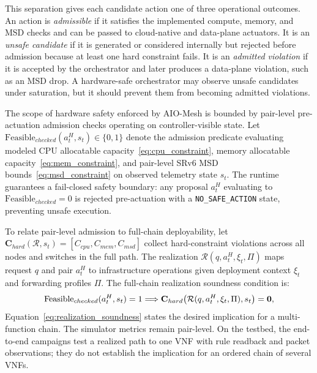 \documentclass[final,5p]{elsarticle}
\newcommand{\rev}[1]{\textcolor{revisiongreen}{#1}}
\begin{document}
This separation gives each candidate action one of three operational outcomes. An action is \textit{admissible} if it satisfies \rev{the implemented} compute, memory, and MSD \rev{checks} and can be passed to cloud-native and data-plane actuators. It is an \textit{unsafe candidate} if it is generated or considered internally but rejected before admission because at least one hard constraint fails. It is an \textit{admitted violation} if it is accepted by the orchestrator and later produces a data-plane violation, such as an MSD drop. A hardware-safe orchestrator may observe unsafe candidates under saturation, but it should prevent them from becoming admitted violations.

\rev{The scope of hardware safety enforced by AIO-Mesh is bounded by pair-level pre-actuation admission checks operating on controller-visible state. Let $\mathrm{Feasible}_{checked}(a_t^H,s_t)\in\{0,1\}$ denote the admission predicate evaluating modeled CPU allocatable capacity~\eqref{eq:cpu_constraint}, memory allocatable capacity~\eqref{eq:mem_constraint}, and pair-level SRv6 MSD bounds~\eqref{eq:msd_constraint} on observed telemetry state $s_t$. The runtime guarantees a fail-closed safety boundary: any proposal $a_t^H$ evaluating to $\mathrm{Feasible}_{checked}=0$ is rejected pre-actuation with a \texttt{NO\_SAFE\_ACTION} state, preventing unsafe execution.}

\rev{To relate pair-level admission to full-chain deployability, let $\mathbf{C}_{hard}(\mathcal{R},s_t)=[C_{cpu},C_{mem},C_{msd}]$ collect hard-constraint violations across all nodes and switches in the full path. The realization $\mathcal{R}(q,a_t^H,\xi_t,\Pi)$ maps request $q$ and pair $a_t^H$ to infrastructure operations given deployment context $\xi_t$ and forwarding profiles $\Pi$. The full-chain realization soundness condition is:}
\begin{equation}
    \rev{\mathrm{Feasible}_{checked}(a_t^H,s_t)=1\Longrightarrow\mathbf{C}_{hard}\!\left(\mathcal{R}(q,a_t^H,\xi_t,\Pi),s_t\right)=\mathbf{0},}
\label{eq:realization_soundness}
\end{equation}
\rev{Equation~\eqref{eq:realization_soundness} states the desired implication for a multi-function chain. The simulator metrics remain pair-level. On the testbed, the end-to-end campaigns test a realized path to one VNF with rule readback and packet observations; they do not establish the implication for an ordered chain of several VNFs.}
\end{document}
